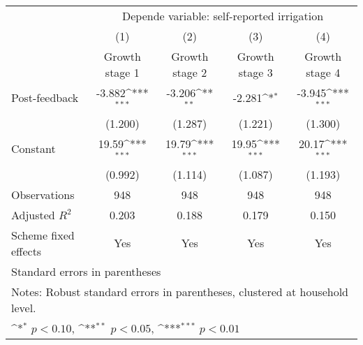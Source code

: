 {
\def\sym#1{\ifmmode^{#1}\else\(^{#1}\)\fi}
\begin{tabular}{l*{4}{c}}
\hline\hline
                    &\multicolumn{4}{c}{Depende variable: self-reported irrigation}                         \\\cmidrule(lr){2-5}
                    &\multicolumn{1}{c}{(1)}&\multicolumn{1}{c}{(2)}&\multicolumn{1}{c}{(3)}&\multicolumn{1}{c}{(4)}\\
                    &\multicolumn{1}{c}{Growth stage 1}&\multicolumn{1}{c}{Growth stage 2}&\multicolumn{1}{c}{Growth stage 3}&\multicolumn{1}{c}{Growth stage 4}\\
\hline
Post-feedback       &      -3.882\sym{***}&      -3.206\sym{**} &      -2.281\sym{*}  &      -3.945\sym{***}\\
                    &     (1.200)         &     (1.287)         &     (1.221)         &     (1.300)         \\
[1em]
Constant            &       19.59\sym{***}&       19.79\sym{***}&       19.95\sym{***}&       20.17\sym{***}\\
                    &     (0.992)         &     (1.114)         &     (1.087)         &     (1.193)         \\
\hline
Observations        &         948         &         948         &         948         &         948         \\
Adjusted \(R^{2}\)  &       0.203         &       0.188         &       0.179         &       0.150         \\
Scheme fixed effects&         Yes         &         Yes         &         Yes         &         Yes         \\
\hline\hline
\multicolumn{5}{l}{\footnotesize Standard errors in parentheses}\\
\multicolumn{5}{l}{\footnotesize Notes: Robust standard errors in parentheses, clustered at household level.}\\
\multicolumn{5}{l}{\footnotesize \sym{*} \(p<0.10\), \sym{**} \(p<0.05\), \sym{***} \(p<0.01\)}\\
\end{tabular}
}
